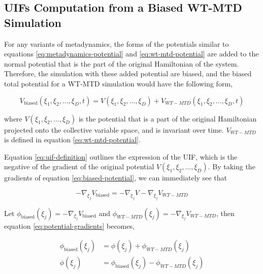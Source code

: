 \begin{spacing}{2.0}
    \subsection{UIFs Computation from a Biased WT-MTD Simulation}

    For any variants of metadynamics, the forms of the potentials similar to equations \ref{eq:metadynamics-potential} and 
    \ref{eq:wt-mtd-potential} are added to the normal potential that is the part of the original Hamiltonian of the system. Therefore, the 
    simulation with these added potential are biased, and the biased total potential for a WT-MTD simulation would have the following form,

    \begin{equation}
        V_{\mathrm{biased}}(\xi_1,\xi_2,\ldots,\xi_D,t) = V(\xi_1,\xi_2,\ldots,\xi_D) + V_{WT-MTD}(\xi_1,\xi_2,\ldots,\xi_D,t)
        \label{eq:biased-potential}
    \end{equation}

    \noindent where $V(\xi_1,\xi_2,\ldots,\xi_D)$ is the potential that is a part of the original Hamiltonian projected onto the collective
    variable space, and is invariant over time. $V_{WT-MTD}$ is defined in equation \ref{eq:wt-mtd-potential}. 

    Equation \ref{eq:uif-definition} outlines the expression of the UIF, which is the negative of the gradient of the original potential
    $V(\xi_1,\xi_2,\ldots,\xi_D)$. By taking the gradients of equation \ref{eq:biased-potential}, we can immediately see that

    \begin{equation}
        -\nabla_{\xi_j}V_{\mathrm{biased}} = -\nabla_{\xi_j}V - \nabla_{\xi_j}V_{WT-MTD}
        \label{eq:potential-gradients}
    \end{equation}

    Let $\phi_{\mathrm{biased}}(\xi_j) = -\nabla_{\xi_j}V_{\mathrm{biased}}$ and $\phi_{WT-MTD}(\xi_j) = -\nabla_{\xi_j}V_{WT-MTD}$, then 
    equation \ref{eq:potential-gradients} becomes,

    \begin{equation}\begin{aligned}
        \phi_{\mathrm{biased}}(\xi_j) &= \phi(\xi_j) + \phi_{WT-MTD}(\xi_j) \\
        \phi(\xi_j) &= \phi_{\mathrm{biased}}(\xi_j) - \phi_{WT-MTD}(\xi_j)
    \end{aligned}\end{equation}
\end{spacing}
